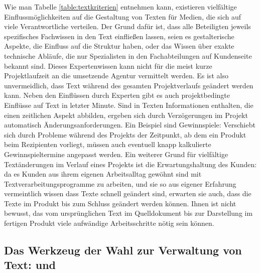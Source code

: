 Wie man Tabelle \ref{table:textkriterien} entnehmen kann, existieren vielfältige Einflussmöglichkeiten auf die Gestaltung von Texten für Medien, die sich auf viele Verantwortliche verteilen. Der Grund dafür ist, dass alle Beteiligten jeweils spezifisches Fachwissen in den Text einfließen lassen, seien es gestalterische Aspekte, die Einfluss auf die Struktur haben, oder das Wissen über exakte technische Abläufe, die nur Spezialisten in den Fachabteilungen auf Kundenseite bekannt sind. Dieses Expertenwissen kann nicht für die meist kurze Projektlaufzeit an die umsetzende Agentur vermittelt werden. Es ist also unvermeidlich, dass Text während des gesamten Projektverlaufs geändert werden kann. Neben den Einflüssen durch Experten gibt es auch projektbedingte Einflüsse auf Text in letzter Minute. Sind in Texten Informationen enthalten, die einen zeitlichen Aspekt abbilden, ergeben sich durch Verzögerungen im Projekt automatisch Änderungsanforderungen. Ein Beispiel sind Gewinnspiele: Verschiebt sich durch Probleme während des Projekts der Zeitpunkt, ab dem ein Produkt beim Rezipienten vorliegt, müssen auch eventuell knapp kalkulierte Gewinnspieltermine angepasst werden. Ein weiterer Grund für vielfältige Textänderungen im Verlauf eines Projekts ist die Erwartungshaltung des Kunden: da es Kunden aus ihrem eigenen Arbeitsalltag gewöhnt sind mit Textverarbeitungsprogramme zu arbeiten, und sie so aus eigener Erfahrung vermeintlich wissen dass Texte schnell geändert sind, erwarten sie auch, dass die Texte im Produkt bis zum Schluss geändert werden können. Ihnen ist nicht bewusst, das vom ursprünglichen Text im Quelldokument bis zur Darstellung im fertigen Produkt viele aufwändige Arbeitsschritte nötig sein können.

\subsection{Das Werkzeug der Wahl zur Verwaltung von Text:  und }\label{l:werkzeugwahl}

